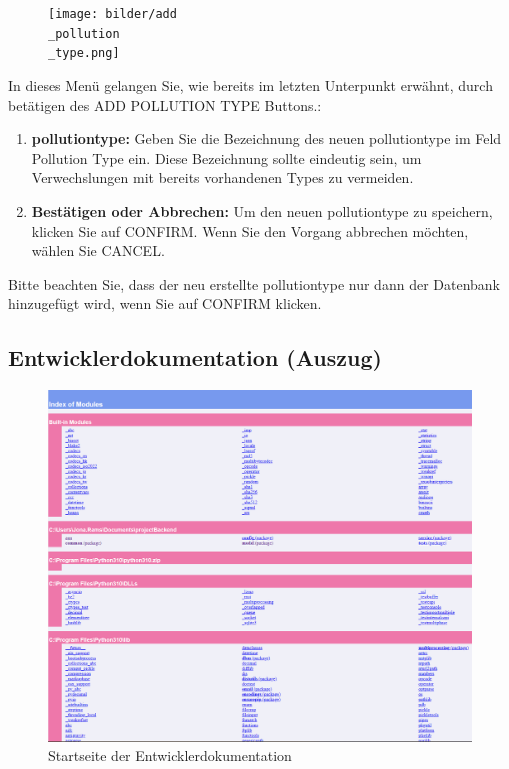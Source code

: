 \documentclass[a4paper,12pt]{article}
\begin{document}
\begin{figure}[h]
\centering
\texttt{[image: bilder/add\\\_pollution\\\_type.png]}
\end{figure}
\noindent In dieses Menü gelangen Sie, wie bereits im letzten Unterpunkt erwähnt, durch betätigen des \glqq ADD POLLUTION TYPE\grqq{} Buttons.:
\begin{enumerate}
        \item \textbf{\gls{pollutiontype}:} Geben Sie die Bezeichnung des neuen \gls{pollutiontype} im Feld \glqq Pollution Type\grqq{} ein. Diese Bezeichnung sollte eindeutig sein, um Verwechslungen mit bereits vorhandenen Types zu vermeiden.
        \item \textbf{Bestätigen oder Abbrechen:} Um den neuen \gls{pollutiontype} zu speichern, klicken Sie auf \glqq CONFIRM\grqq{}. Wenn Sie den Vorgang abbrechen möchten, wählen Sie \glqq CANCEL\grqq{}. \end{enumerate}

\noindent Bitte beachten Sie, dass der neu erstellte \gls{pollutiontype} nur dann der Datenbank hinzugefügt wird, wenn Sie auf \glqq CONFIRM\grqq{} klicken.


\clearpage
\subsection{Entwicklerdokumentation (Auszug)}
\label{sec:entwicklerdokumentation}

\begin{figure}[h]
\centering
\includegraphics[width=1\textwidth]{bilder/entwicklerdokumentation.png}
\caption{Startseite der Entwicklerdokumentation}
\end{figure}
\end{document}
